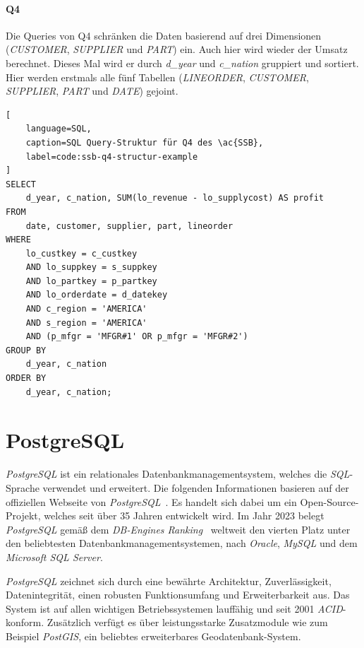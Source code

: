 \paragraph{Q4}
Die Queries von Q4 schränken die Daten basierend auf drei Dimensionen\\ (\emph{CUSTOMER}, \emph{SUPPLIER} und \emph{PART}) ein.
Auch hier wird wieder der Umsatz berechnet.
Dieses Mal wird er durch \emph{d\_year} und \emph{c\_nation} gruppiert und sortiert.
Hier werden erstmals alle fünf Tabellen (\emph{LINEORDER}, \emph{CUSTOMER}, \emph{SUPPLIER}, \emph{PART} und \emph{DATE}) gejoint.

\begin{lstlisting}[
    language=SQL,
    caption=SQL Query-Struktur für Q4 des \ac{SSB},
    label=code:ssb-q4-structur-example
]
SELECT 
    d_year, c_nation, SUM(lo_revenue - lo_supplycost) AS profit
FROM 
    date, customer, supplier, part, lineorder
WHERE 
    lo_custkey = c_custkey
    AND lo_suppkey = s_suppkey
    AND lo_partkey = p_partkey
    AND lo_orderdate = d_datekey
    AND c_region = 'AMERICA'
    AND s_region = 'AMERICA'
    AND (p_mfgr = 'MFGR#1' OR p_mfgr = 'MFGR#2')
GROUP BY 
    d_year, c_nation
ORDER BY 
    d_year, c_nation;

\end{lstlisting}

\section{PostgreSQL}
\emph{PostgreSQL} ist ein relationales Datenbankmanagementsystem, welches die \emph{SQL}-Spra\-che ver\-wen\-det und erweitert. Die folgenden Informationen basieren auf der offiziellen Webseite von \emph{PostgreSQL}~\cite{the_postgresql_global_development_group_postgresql_nodate}. Es handelt sich dabei um ein Open-Source-Projekt, welches seit über 35 Jahren entwickelt wird. Im Jahr 2023 belegt \emph{PostgreSQL} gemäß dem \emph{DB-Engines Ranking}~\cite{db-engines_most_2023} weltweit den vierten Platz unter den beliebtesten Datenbankmanagementsystemen, nach \emph{Oracle}, \emph{MySQL} und dem \emph{Microsoft SQL Server}.

\emph{PostgreSQL} zeichnet sich durch eine bewährte Architektur, Zuverlässigkeit, Datenintegrität, einen robusten Funktionsumfang und Erweiterbarkeit aus. Das System ist auf allen wichtigen Betriebssystemen lauffähig und seit 2001 \emph{ACID}-konform.  Zusätzlich verfügt es über leistungsstarke Zusatzmodule wie zum Beispiel \emph{PostGIS}, ein beliebtes erweiterbares Geodatenbank-System.

